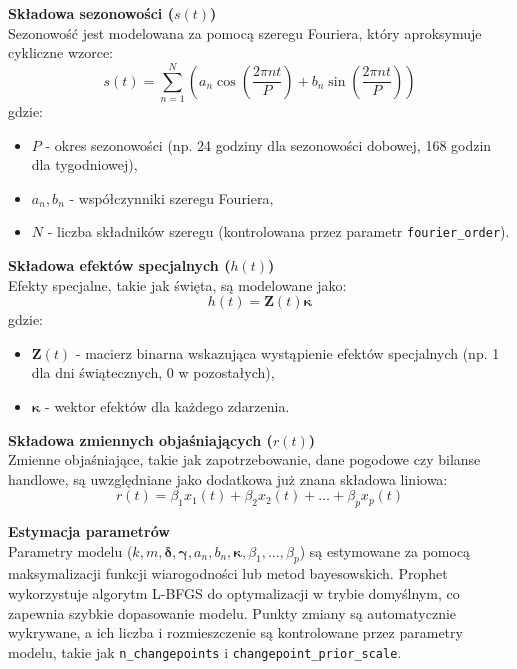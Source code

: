 \textbf{Składowa sezonowości (\( s(t) \))} \\
Sezonowość jest modelowana za pomocą szeregu Fouriera, który aproksymuje cykliczne wzorce:
\begin{equation}
s(t) = \sum_{n=1}^N \left( a_n \cos\left(\frac{2\pi n t}{P}\right) + b_n \sin\left(\frac{2\pi n t}{P}\right) \right)
\end{equation}
gdzie:
\begin{itemize}
    \item \( P \) - okres sezonowości (np. 24 godziny dla sezonowości dobowej, 168 godzin dla tygodniowej),
    \item \( a_n, b_n \) - współczynniki szeregu Fouriera,
    \item \( N \) - liczba składników szeregu (kontrolowana przez parametr \texttt{fourier\_order}).
\end{itemize}

\textbf{Składowa efektów specjalnych (\( h(t) \))} \\
Efekty specjalne, takie jak święta, są modelowane jako:
\begin{equation}
h(t) = \mathbf{Z}(t) \boldsymbol{\kappa}
\end{equation}
gdzie:
\begin{itemize}
    \item \( \mathbf{Z}(t) \) - macierz binarna wskazująca wystąpienie efektów specjalnych (np. 1 dla dni świątecznych, 0 w pozostałych),
    \item \( \boldsymbol{\kappa} \) - wektor efektów dla każdego zdarzenia.
\end{itemize}

\textbf{Składowa zmiennych objaśniających (\( r(t) \))} \\
Zmienne objaśniające, takie jak zapotrzebowanie, dane pogodowe czy bilanse handlowe, są uwzględniane jako dodatkowa już znana składowa liniowa:
\begin{equation}
r(t) = \beta_1 x_1(t) + \beta_2 x_2(t) + \dots + \beta_p x_p(t)
\end{equation}

\textbf{Estymacja parametrów} \\
Parametry modelu (\( k, m, \boldsymbol{\delta}, \boldsymbol{\gamma}, a_n, b_n, \boldsymbol{\kappa}, \beta_1, \dots, \beta_p \)) są estymowane za pomocą maksymalizacji funkcji wiarogodności lub metod bayesowskich. Prophet wykorzystuje algorytm L-BFGS do optymalizacji w trybie domyślnym, co zapewnia szybkie dopasowanie modelu. Punkty zmiany są automatycznie wykrywane, a ich liczba i rozmieszczenie są kontrolowane przez parametry modelu, takie jak \texttt{n\_changepoints} i \texttt{changepoint\_prior\_scale}.

